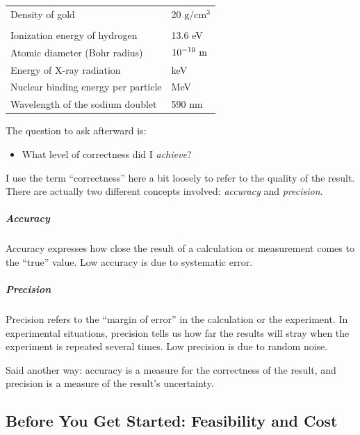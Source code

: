 \begin{table}[t!]
{\begin{tabular}{lp{}}
Density of gold                         & 20$\text{ g}/\text{cm}^3$ \\
                                        & \\[-6pt]
Ionization energy of hydrogen           & 13.6 eV \\
Atomic diameter (Bohr radius)           & $\hbox{10}^{-\hbox{\scriptsize 10}}\text{ m}$ \\
Energy of X-ray radiation               & keV \\
Nuclear binding energy per particle     & MeV \\
Wavelength of the sodium doublet                          & 590 nm \\
\end{tabular}}
\end{table}

\clearpage
   
The question to ask afterward is:
\begin{itemize}
\item What level of correctness did I \emph{achieve}?
\end{itemize}

I use the term ``correctness'' here a bit loosely to refer to the
quality of the result. There are actually two different concepts
involved: \emph{accuracy} and \emph{precision}.
\begin{unnumlist}
\subparagraph{Accuracy}
\item {} Accuracy expresses how close the result of a calculation
  or measurement comes to the ``true'' value. Low accuracy is due to
  systematic error.
\subparagraph{Precision}  
\item Precision refers to the ``margin of error''  in the 
  calculation or the experiment. In experimental situations, precision
  tells us how far the results will stray when the experiment is 
  repeated several times. Low precision is due to random noise.
\end{unnumlist}

Said another way: accuracy is a measure for the correctness of the
result, and precision is a measure of the result's uncertainty.

\vspace*{-12pt}
\subsection{Before You Get Started: Feasibility and Cost}
     
